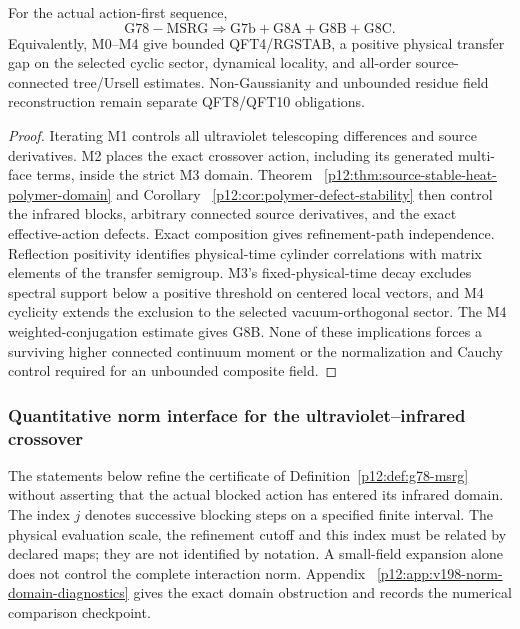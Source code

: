 \documentclass[12pt,a4paper]{article}
\begin{document}
\begin{theorem}
\label{p12:thm:g78-msrg-consequence}
For the actual action-first sequence,
\[
 \boxed{
 \mathrm{G78\!-\!MSRG}
 \Longrightarrow
 \mathrm{G7b}+\mathrm{G8A}+\mathrm{G8B}+\mathrm{G8C}.}
\]
Equivalently, M0--M4 give bounded QFT4/RGSTAB, a positive physical transfer
gap on the selected cyclic sector, dynamical locality, and all-order
source-connected tree/Ursell estimates.  Non-Gaussianity and unbounded residue
field reconstruction remain separate QFT8/QFT10 obligations.
\end{theorem}
\begin{proof}
Iterating M1 controls all ultraviolet telescoping differences and source
derivatives.  M2 places the exact crossover action, including its generated
multi-face terms, inside the strict M3 domain.  Theorem~
\ref{p12:thm:source-stable-heat-polymer-domain} and Corollary~
\ref{p12:cor:polymer-defect-stability} then control the infrared blocks,
arbitrary connected source derivatives, and the exact effective-action
defects.  Exact composition gives refinement-path independence.  Reflection
positivity identifies physical-time cylinder correlations with matrix
elements of the transfer semigroup.  M3's fixed-physical-time decay excludes
spectral support below a positive threshold on centered local vectors, and
M4 cyclicity extends the exclusion to the selected vacuum-orthogonal sector.
The M4 weighted-conjugation estimate gives G8B.  None of these implications
forces a surviving higher connected continuum moment or the normalization and
Cauchy control required for an unbounded composite field.
\end{proof}



\subsubsection{Quantitative norm interface for the ultraviolet--infrared crossover}
\label{p12:subsec:v198-rg-norm-interface}

The statements below refine the certificate of
Definition~\ref{p12:def:g78-msrg} without asserting that the actual blocked
action has entered its infrared domain.  The index $j$ denotes successive
blocking steps on a specified finite interval.  The physical evaluation
scale, the refinement cutoff and this index must be related by declared
maps; they are not identified by notation.  A small-field expansion alone
does not control the complete interaction norm.  Appendix~
\ref{p12:app:v198-norm-domain-diagnostics} gives the exact domain obstruction
and records the numerical comparison checkpoint.
\end{document}
